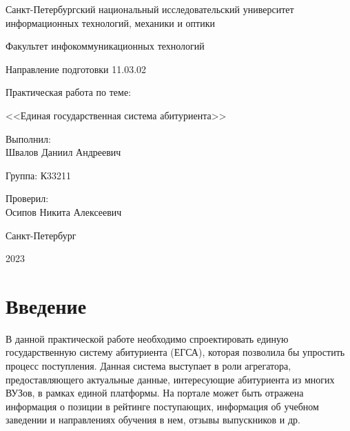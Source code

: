 \documentclass[a4paper, 14pt]{extarticle}
\begin{document}
\begin{titlepage}
  \vspace{0pt plus2fill}
  \noindent

  \vspace{0pt plus6fill}
  \begin{center}
    Санкт-Петербургский национальный исследовательский университет
    информационных технологий, механики и оптики

    \vspace{0pt plus2fill}

    Факультет инфокоммуникационных технологий

    Направление подготовки 11.03.02

    \vspace{0pt plus4fill}

    Практическая работа по теме:

    <<Единая государственная система абитуриента>>

  \end{center}

  \vspace{0pt plus7fill}
  \begin{flushright}
    Выполнил: \\
    Швалов Даниил Андреевич

    Группа: К33211

    Проверил: \\
    Осипов Никита Алексеевич
  \end{flushright}

  \vspace{0pt plus2fill}
  \begin{center}
    Санкт-Петербург

    2023
  \end{center}
\end{titlepage}

\setcounter{page}{2}

\section{Введение}

В данной практической работе необходимо спроектировать единую государственную
систему абитуриента (ЕГСА), которая позволила бы упростить процесс поступления.
Данная система выступает в роли агрегатора, предоставляющего актуальные данные,
интересующие абитуриента из многих ВУЗов, в рамках единой платформы. На портале
может быть отражена информация о позиции в рейтинге поступающих, информация об
учебном заведении и направлениях обучения в нем, отзывы выпускников и др.
\end{document}
